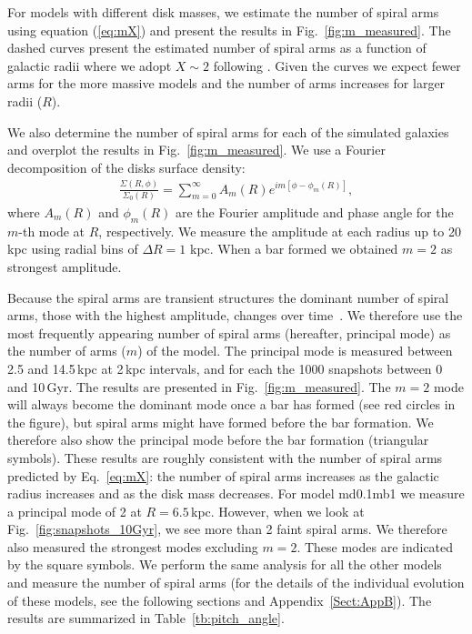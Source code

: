 For models with different disk masses, 
we estimate the number of spiral arms using equation (\ref{eq:mX})
and present the results in Fig.~\ref{fig:m_measured}. The dashed curves 
present the estimated number of spiral arms as a function of galactic radii 
where we adopt $X\sim2$ following 
\citet{1985ApJ...298..486C, 2014PASA...31...35D}.
Given the curves we expect fewer arms for the more massive models
and the number of arms increases for larger radii ($R$).

We also determine the number of spiral arms for each of the 
simulated galaxies and overplot the results in Fig.~\ref{fig:m_measured}.
We use a Fourier decomposition of the disks surface density:
\begin{eqnarray}
\frac{\Sigma(R,\phi)}{\Sigma_0(R)}=\sum_{m=0}^{\infty}A_m(R)e^{im[\phi-\phi_m(R)]},
\label{eq:Fourier}
\end{eqnarray}
where $A_m(R)$ and $\phi_m(R)$ are the Fourier amplitude and phase angle for
the $m$-th mode at $R$, respectively. 
We measure the amplitude at each radius up to 20 kpc using radial bins of 
$\Delta R=1$ kpc.
When a bar formed we obtained $m=2$ as strongest amplitude. 

Because the spiral arms are transient structures the dominant number 
of spiral arms,
those with the highest amplitude, changes over time~\citep{2011ApJ...730..109F}.
We therefore use the most frequently appearing 
number of spiral arms (hereafter, principal mode) 
as the number of arms ($m$) of the model.
The principal mode is measured between 2.5 and 14.5\,kpc at 2\,kpc intervals,
and for each the 1000 snapshots
between 0 and 10\,Gyr. The results are presented in Fig.~\ref{fig:m_measured}.
The $m=2$ mode will always become the dominant mode once a bar has formed (see 
red circles in the figure), but spiral arms might have formed before 
the bar formation.
We therefore also show the principal mode before the bar 
formation (triangular symbols). These results are roughly consistent 
with the number of spiral arms predicted by Eq.~\ref{eq:mX}:
the number of spiral arms increases as the galactic radius increases
and as the disk mass decreases.
For model md0.1mb1 we measure a principal mode of 2 at $R=6.5$\,kpc.
However, when we look at Fig.~\ref{fig:snapshots_10Gyr}, we 
see more than 2 faint spiral arms. We therefore also measured the strongest 
modes excluding $m=2$. These modes are indicated by the square symbols.
We perform the same analysis for all the other models and measure the
number of spiral arms (for the details of the individual evolution of these
models, see the following sections and Appendix~\ref{Sect:AppB}). 
The results are summarized in Table~\ref{tb:pitch_angle}.

